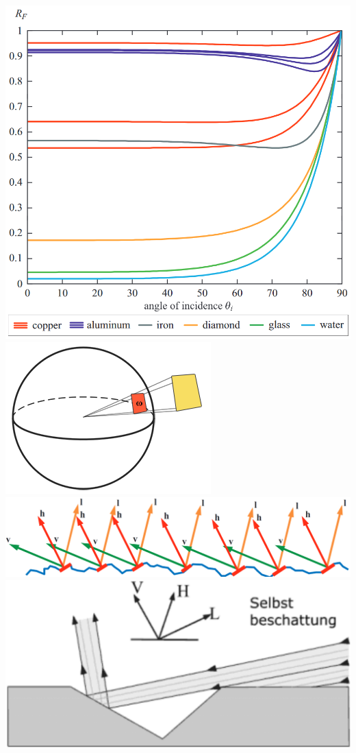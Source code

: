 \documentclass[
  11pt,
  a4paper,
  oneside
  ]{article}
\begin{document}
\includegraphics*[width=0.9 \textwidth]{images/fresnelDiagram.png}\\
\includegraphics*[width=0.9 \textwidth]{images/solid_angle.png}\\
\includegraphics*[width=0.9 \textwidth]{images/normalDistriFun.png}\\
\includegraphics*[width=0.9 \textwidth]{images/selstbeschattung.png}
\end{document}
